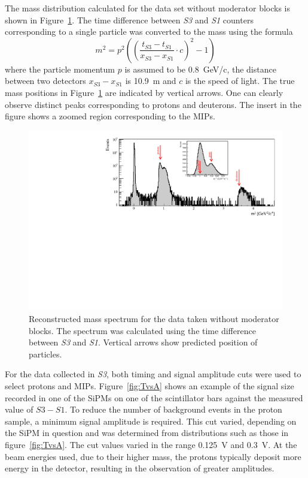 The mass distribution calculated for the data set without moderator blocks is shown in Figure~\ref{fig:s3tof_mass}.
The time difference between \textit{S3} and \textit{S1} counters corresponding to a single particle was converted to the mass using the formula
\begin{equation} 
  m^2 = p^2 \left( 
  \left(\frac{t_{S3}-t_{S1}}{x_{S3}-x_{S1}} \cdot c \right)^2
  - 1  \right)
\end{equation}
where the particle momentum $p$ is assumed to be 0.8~GeV/c, the distance between two detectors $x_{\mathit{S3}}-x_{\mathit{S1}}$ is 10.9~m and $c$ is the speed of light. 
The true mass positions in Figure~\ref{fig:s3tof_mass} are indicated by vertical arrows.
One can clearly observe distinct peaks corresponding to protons and deuterons. 
The insert in the figure shows a zoomed region corresponding to the MIPs. 

\begin{figure}[h]
  \centering
  \includegraphics[width=0.9\linewidth]{files/Figures/Data_2018_8_31_b2_800MeV_0block_All.pdf}
  \caption{Reconstructed mass spectrum for the data taken without moderator blocks. The spectrum was calculated using the time difference between \textit{S3} and \textit{S1}. Vertical arrows show predicted position of particles.}
  \label{fig:s3tof_mass}
\end{figure}



For the data collected in \textit{S3}, both timing and signal amplitude cuts were used to select protons and MIPs.
Figure~\ref{fig:TvsA} shows an example of the signal size recorded in one of the SiPMs on one of the scintillator bars against the measured value of $\mathit{S3} - \mathit{S1}$.
To reduce the number of background events in the proton sample, a minimum signal amplitude is required.
This cut varied, depending on the SiPM in question and was determined from distributions such as those in figure~\ref{fig:TvsA}. 
The cut values varied in the range 0.125~V and 0.3~V.
At the beam energies used, due to their higher mass, the protons typically deposit more energy in the detector, resulting in the observation of greater amplitudes.

